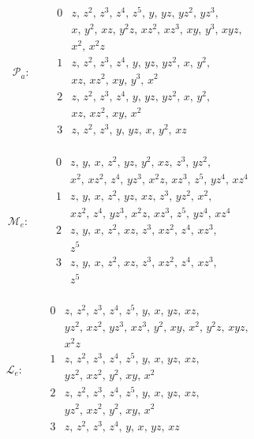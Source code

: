 \documentclass[11pt]{amsart}
\theoremstyle{definition}
\theoremstyle{remark}
\numberwithin{equation}{section}
\begin{document}
\[
\mathcal P_a:\qquad\begin{array}{c|l}
0&z,\,z^{2},\,z^{3},\,z^{4},\,z^{5},\,y,\,yz,\,yz^{2},\,yz^{3},\\
&x,\,y^{2},\,xz,\,y^{2}z,\,xz^{2},\,xz^{3},\,xy,\,y^{3},\,xyz,\\
&x^{2},\,x^{2}z\\
1&z,\,z^{2},\,z^{3},\,z^{4},\,y,\,yz,\,yz^{2},\,x,\,y^{2},\\
&xz,\,xz^{2},\,xy,\,y^{3},\,x^{2}\\
2&z,\,z^{2},\,z^{3},\,z^{4},\,y,\,yz,\,yz^{2},\,x,\,y^{2},\\
&xz,\,xz^{2},\,xy,\,x^{2}\\
3&z,\,z^{2},\,z^{3},\,y,\,yz,\,x,\,y^{2},\,xz\\
\end{array}
\]

\[
\mathcal M_e:\qquad\begin{array}{c|l}
0&z,\,y,\,x,\,z^{2},\,yz,\,y^{2},\,xz,\,z^{3},\,yz^{2},\\
&x^{2},\,xz^{2},\,z^{4},\,yz^{3},\,x^{2}z,\,xz^{3},\,z^{5},\,yz^{4},\,xz^{4}\\
1&z,\,y,\,x,\,z^{2},\,yz,\,xz,\,z^{3},\,yz^{2},\,x^{2},\\
&xz^{2},\,z^{4},\,yz^{3},\,x^{2}z,\,xz^{3},\,z^{5},\,yz^{4},\,xz^{4}\\
2&z,\,y,\,x,\,z^{2},\,xz,\,z^{3},\,xz^{2},\,z^{4},\,xz^{3},\\
&z^{5}\\
3&z,\,y,\,x,\,z^{2},\,xz,\,z^{3},\,xz^{2},\,z^{4},\,xz^{3},\\
&z^{5}\\
\end{array}
\]

\[
\mathcal L_e:\qquad\begin{array}{c|l}
0&z,\,z^{2},\,z^{3},\,z^{4},\,z^{5},\,y,\,x,\,yz,\,xz,\\
&yz^{2},\,xz^{2},\,yz^{3},\,xz^{3},\,y^{2},\,xy,\,x^{2},\,y^{2}z,\,xyz,\\
&x^{2}z\\
1&z,\,z^{2},\,z^{3},\,z^{4},\,z^{5},\,y,\,x,\,yz,\,xz,\\
&yz^{2},\,xz^{2},\,y^{2},\,xy,\,x^{2}\\
2&z,\,z^{2},\,z^{3},\,z^{4},\,z^{5},\,y,\,x,\,yz,\,xz,\\
&yz^{2},\,xz^{2},\,y^{2},\,xy,\,x^{2}\\
3&z,\,z^{2},\,z^{3},\,z^{4},\,y,\,x,\,yz,\,xz\\
\end{array}
\]
\end{document}

